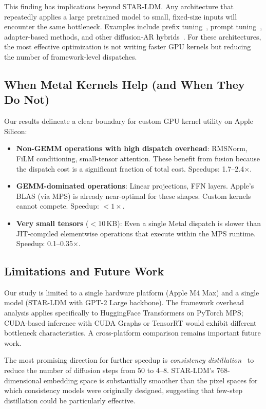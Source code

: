 \documentclass[sigconf,authordraft]{acmart}
\begin{document}
This finding has implications beyond STAR-LDM. Any architecture that repeatedly applies a large pretrained model to small, fixed-size inputs will encounter the same bottleneck. Examples include prefix tuning~\cite{li2021prefix}, prompt tuning~\cite{lester2021power}, adapter-based methods, and other diffusion-AR hybrids~\cite{zhang2023planner}. For these architectures, the most effective optimization is not writing faster GPU kernels but reducing the number of framework-level dispatches.

\subsection{When Metal Kernels Help (and When They Do Not)}

Our results delineate a clear boundary for custom GPU kernel utility on Apple Silicon:

\begin{itemize}
    \item \textbf{Non-GEMM operations with high dispatch overhead}: RMSNorm, FiLM conditioning, small-tensor attention. These benefit from fusion because the dispatch cost is a significant fraction of total cost. Speedups: 1.7--2.4$\times$.
    \item \textbf{GEMM-dominated operations}: Linear projections, FFN layers. Apple's BLAS (via MPS) is already near-optimal for these shapes. Custom kernels cannot compete. Speedup: $< 1\times$.
    \item \textbf{Very small tensors} ($< 10$\,KB): Even a single Metal dispatch is slower than JIT-compiled elementwise operations that execute within the MPS runtime. Speedup: 0.1--0.35$\times$.
\end{itemize}

\subsection{Limitations and Future Work}

Our study is limited to a single hardware platform (Apple M4 Max) and a single model (STAR-LDM with GPT-2 Large backbone). The framework overhead analysis applies specifically to HuggingFace Transformers on PyTorch MPS; CUDA-based inference with CUDA Graphs or TensorRT would exhibit different bottleneck characteristics. A cross-platform comparison remains important future work.

The most promising direction for further speedup is \textit{consistency distillation}~\cite{song2023consistency,luo2023latent} to reduce the number of diffusion steps from 50 to 4--8. STAR-LDM's 768-dimensional embedding space is substantially smoother than the pixel spaces for which consistency models were originally designed, suggesting that few-step distillation could be particularly effective.
\end{document}
